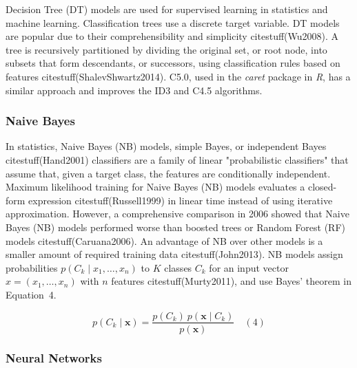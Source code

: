 \let\LaTeXcline\cline\documentclass[sn-mathphys-num]{sn-jnl}\let\cline\LaTeXcline
\begin{document}
Decision Tree (DT) models are used for supervised learning in statistics and machine learning. Classification trees use a discrete target variable. DT models are popular due to their comprehensibility and simplicity citestuff(Wu2008). A tree is recursively partitioned by dividing the original set, or root node, into subsets that form descendants, or successors, using classification rules based on features citestuff(ShalevShwartz2014). C5.0, used in the \textit{caret} package in \textit{R}, has a similar approach and improves the ID3 and C4.5 algorithms.

\subsubsection{Naive Bayes}

In statistics, Naive Bayes (NB) models, simple Bayes, or independent Bayes citestuff(Hand2001) classifiers are a family of linear "probabilistic classifiers" that assume that, given a target class, the features are conditionally independent. Maximum likelihood training for Naive Bayes (NB) models evaluates a closed-form expression citestuff(Russell1999) in linear time instead of using iterative approximation. However, a comprehensive comparison in 2006 showed that Naive Bayes (NB) models performed worse than boosted trees or Random Forest (RF) models citestuff(Caruana2006). An advantage of NB over other models is a smaller amount of required training data citestuff(John2013). NB models assign probabilities $p(C_{k}\mid x_{1},\ldots, x_{n})$ to $K$ classes $C_{k}$ for an input vector $x = (x_{1},\ldots, x_{n})$ with $n$ features citestuff(Murty2011), and use Bayes' theorem in Equation~4.

\begin{equation}
	p(C_{k}\mid \mathbf{x})={\frac{p(C_{k})\ p(\mathbf{x} \mid C_{k})}{p(\mathbf{x})}}
	\quad\left(4\right)
\end{equation}

\subsubsection{Neural Networks}
\end{document}
